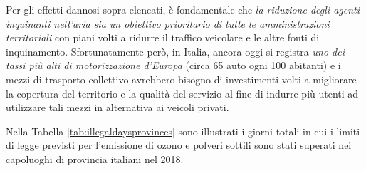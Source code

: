 Per gli effetti dannosi sopra elencati, è fondamentale che \emph{la riduzione
degli agenti inquinanti nell'aria sia un obiettivo prioritario di tutte le
amministrazioni territoriali} con piani volti a ridurre il traffico veicolare e
le altre fonti di inquinamento. Sfortunatamente però, in Italia, ancora oggi si
registra \emph{uno dei tassi più alti di motorizzazione d'Europa} (circa 65 auto
ogni 100 abitanti) e i mezzi di trasporto collettivo avrebbero bisogno di
investimenti volti a migliorare la copertura del territorio e la qualità
del servizio al fine di indurre più utenti ad utilizzare tali mezzi in
alternativa ai veicoli privati.

Nella Tabella \vref{tab:illegaldaysprovinces} sono illustrati i giorni totali in
cui i limiti di legge previsti per l'emissione di ozono e polveri sottili sono
stati superati nei capoluoghi di provincia italiani nel 2018.
